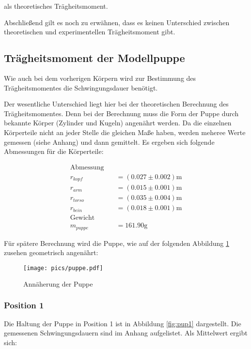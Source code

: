 als theoretisches Trägheitsmoment.

Abschließend gilt es noch zu erwähnen, dass es keinen Unterschied
zwischen theoretischen und experimentellen Trägheitsmoment gibt. %

\subsection{Trägheitsmoment der Modellpuppe}

Wie auch bei dem vorherigen Körpern wird zur Bestimmung des Trägheitsmomentes
die Schwingungsdauer benötigt. %

Der wesentliche Unterschied liegt hier bei der theoretischen Berechnung des Trägheitsmomentes. %
Denn bei der Berechnung muss die Form der Puppe
durch bekannte Körper (Zylinder und Kugeln) angenährt werden.
Da die einzelnen Körperteile nicht an jeder Stelle die gleichen Maße haben,
werden meheree Werte gemessen (siehe Anhang) und dann gemittelt.
Es ergeben sich folgende Abmessungen für die Körperteile:

\begin{align*}
\text{Abmessung} \quad &\\
r_{kopf}&=\left(\num{0.027}\pm\num{0.002}\right)\si{\meter}\\
r_{arm}&=\left(\num{0.015}\pm\num{0.001}\right)\si{\meter}\\
r_{torso}&=\left(\num{0.035}\pm\num{0.004}\right)\si{\meter}\\
r_{bein}&=\left(\num{0.018}\pm\num{0.001}\right)\si{\meter}\\
\text{Gewicht} \quad &\\
m_{puppe}&=\num{161.90}\si{\gram}
\end{align*}

Für spätere Berechnung wird die Puppe, wie auf der folgenden Abbildung \ref{fig:approx_puppe} zusehen geometrisch angenährt: %


\begin{figure}
  \centering
  \texttt{[image: pics/puppe.pdf]}
  \caption{Annäherung der Puppe}
  \label{fig:approx_puppe}
\end{figure}

\subsubsection{Position 1}

Die Haltung der Puppe in Position 1 ist in Abbildung \ref{fig:pup1} dargestellt.
Die gemessenen Schwingungsdauern sind im Anhang aufgelistet.
Als Mittelwert ergibt sich:

